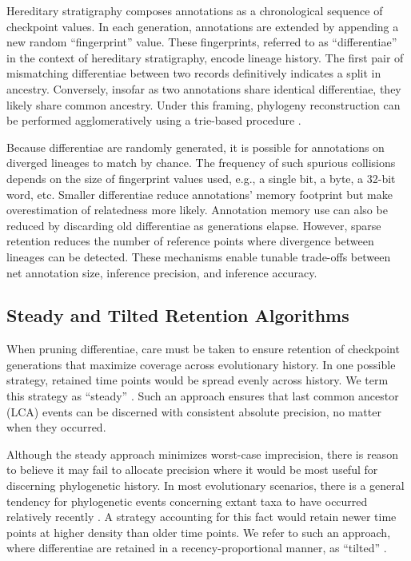 Hereditary stratigraphy composes annotations as a chronological sequence of checkpoint values.
In each generation, annotations are extended by appending a new random ``fingerprint'' value.
These fingerprints, referred to as ``differentiae'' in the context of hereditary stratigraphy, encode lineage history.
The first pair of mismatching differentiae between two records definitively indicates a split in ancestry.
Conversely, insofar as two annotations share identical differentiae, they likely share common ancestry.
Under this framing, phylogeny reconstruction can be performed agglomeratively using a trie-based procedure \citep{moreno2024analysis}.

Because differentiae are randomly generated, it is possible for annotations on diverged lineages to match by chance.
The frequency of such spurious collisions depends on the size of fingerprint values used, e.g., a single bit, a byte, a 32-bit word, etc.
Smaller differentiae reduce annotations' memory footprint but make overestimation of relatedness more likely.
Annotation memory use can also be reduced by discarding old differentiae as generations elapse.
However, sparse retention reduces the number of reference points where divergence between lineages can be detected.
These mechanisms enable tunable trade-offs between net annotation size, inference precision, and inference accuracy.

\subsection{Steady and Tilted Retention Algorithms}
\label{sec:methods-steady-vs-tilted-algorithms}



When pruning differentiae, care must be taken to ensure retention of checkpoint generations that maximize coverage across evolutionary history.
In one possible strategy, retained time points would be spread evenly across history.
We term this strategy as ``steady'' \citep{han2005stream,zhao2005generalized}.
Such an approach ensures that last common ancestor (LCA) events can be discerned with consistent absolute precision, no matter when they occurred.

Although the steady approach minimizes worst-case imprecision, there is reason to believe it may fail to allocate precision where it would be most useful for discerning phylogenetic history.
In most evolutionary scenarios, there is a general tendency for phylogenetic events concerning extant taxa to have occurred relatively recently \citep{zhaxybayeva2004cladogenesis}.
A strategy accounting for this fact would retain newer time points at higher density than older time points.
We refer to such an approach, where differentiae are retained in a recency-proportional manner, as ``tilted'' \citep{han2005stream,zhao2005generalized}.

